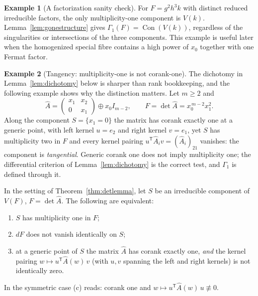\documentclass[acmsmall,screen,nonacm]{acmart}
\theoremstyle{definition}
\newtheorem{example}{Example}[section]
\theoremstyle{remark}
\DeclareMathOperator{\Con}{Con}
\newcommand{\Gone}{\Gamma_{\!1}}
\begin{document}
\begin{example}[A factorization sanity check]
For $F=g^2h^3k$ with distinct reduced irreducible factors, the only
multiplicity-one component is $V(k)$.  Lemma~\ref{lem:gonestructure} gives
$\Gone(F)=\Con(V(k))$, regardless of the singularities or intersections of
the three components.  This example is useful later when the homogenized
special fibre contains a high power of $x_0$ together with one Fermat factor.
\end{example}

\begin{example}[Tangency: multiplicity-one is not corank-one]
\label{ex:tangency}
The dichotomy in Lemma~\ref{lem:dichotomy} below is sharper than rank
bookkeeping, and the following example shows why the distinction
matters.  Let $m\ge2$ and
\[
  \widehat A=\begin{pmatrix}x_1&x_2\\ 0&x_1\end{pmatrix}
  \oplus x_0 I_{m-2},
  \qquad F=\det\widehat A=x_0^{\,m-2}x_1^2 .
\]
Along the component $S=\{x_1=0\}$ the matrix has corank exactly one at
a generic point, with left kernel $u=e_2$ and right kernel $v=e_1$,
yet $S$ has multiplicity two in $F$ and every kernel pairing
$u^{\mathsf T}\widehat A_iv=(\widehat A_i)_{21}$ vanishes: the
component is \emph{tangential}.  Generic corank one does not imply
multiplicity one; the differential criterion of
Lemma~\ref{lem:dichotomy} is the correct test, and $\Gone$ is defined
through it.
\end{example}

\begin{lemma}
\label{lem:dichotomy}
In the setting of Theorem~\ref{thm:detlemma}, let $S$ be an
irreducible component of $V(F)$, $F=\det\widehat A$.  The following
are equivalent:
\begin{enumerate}[label=(\alph*),leftmargin=2.2em]
\item $S$ has multiplicity one in $F$;
\item $dF$ does not vanish identically on $S$;
\item at a generic point of $S$ the matrix $\widehat A$ has corank
exactly one, \emph{and} the kernel pairing
$w\mapsto u^{\mathsf T}\widehat A(w)\,v$ (with $u,v$ spanning the left
and right kernels) is not identically zero.
\end{enumerate}
In the symmetric case (c) reads: corank one and
$w\mapsto u^{\mathsf T}\widehat A(w)\,u\not\equiv0$.
\end{lemma}
\end{document}
